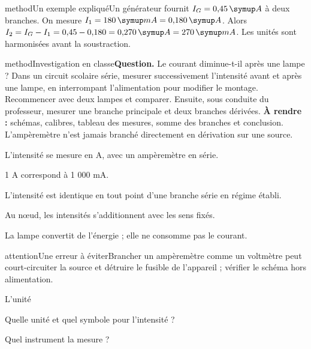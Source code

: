 \begin{pcEncadre}{method}{Un exemple expliqué}Un générateur fournit $I_G=0{,}45\unite A$ à deux branches. On mesure $I_1=180\unite{mA}=0{,}180\unite A$. Alors $I_2=I_G-I_1=0{,}45-0{,}180=0{,}270\unite A=270\unite{mA}$. Les unités sont harmonisées avant la soustraction.\end{pcEncadre}
\label{activite-14}
\begin{pcEncadre}{method}{Investigation en classe}\textbf{Question.} Le courant diminue-t-il après une lampe ? Dans un circuit scolaire série, mesurer successivement l’intensité avant et après une lampe, en interrompant l’alimentation pour modifier le montage. Recommencer avec deux lampes et comparer. Ensuite, sous conduite du professeur, mesurer une branche principale et deux branches dérivées. \textbf{À rendre :} schémas, calibres, tableau des mesures, somme des branches et conclusion. L’ampèremètre n’est jamais branché directement en dérivation sur une source.\end{pcEncadre}
\begin{questions}
\item L’intensité se mesure en A, avec un ampèremètre en série.
\item 1 A correspond à 1 000 mA.
\item L’intensité est identique en tout point d’une branche série en régime établi.
\item Au nœud, les intensités s’additionnent avec les sens fixés.
\item La lampe convertit de l’énergie ; elle ne consomme pas le courant.
\end{questions}
\begin{pcEncadre}{attention}{Une erreur à éviter}Brancher un ampèremètre comme un voltmètre peut court-circuiter la source et détruire le fusible de l’appareil ; vérifier le schéma hors alimentation.\end{pcEncadre}
\pcGrille
\clearpage{}
\par\noindent\begin{minipage}{\linewidth}
\begin{exercice}[1]{L’unité}
\begin{questions}
\item Quelle unité et quel symbole pour l’intensité ?
\item Quel instrument la mesure ?
\end{questions}
\end{exercice}
\end{minipage}
